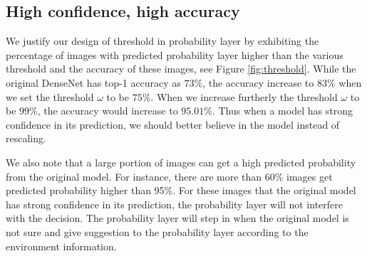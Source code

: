 \documentclass[pageno]{jpaper}
\begin{document}
\subsection{High confidence, high accuracy}
We justify our design of threshold in probability layer by exhibiting the percentage of images with predicted probability layer higher than the various threshold and the accuracy of these images, see Figure \ref{fig:threshold}. While the original DenseNet has top-1 accuracy as $73\%$, the accuracy increase to $83\%$ when we set the threshold $\omega$ to be $75\%$. When we increase furtherly the threshold $\omega$ to be $99\%$, the accuracy would increase to $95.01\%$. Thus when a model has strong confidence in its prediction, we should better believe in the model instead of rescaling. 

We also note that a large portion of images can get a high predicted probability from the original model. For instance, there are more than 60\% images get predicted probability higher than 95\%. For these images that the original model has strong confidence in its prediction, the probability layer will not interfere with the decision. The probability layer will step in when the original model is not sure and give suggestion to the probability layer according to the environment information. 
\end{document}
